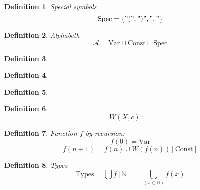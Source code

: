 \documentclass[10pt,a4paper]{article}
\newtheorem{mydef}{Definition}
\newcommand{\Var}{\mbox{Var}}
\newcommand{\Const}{\mbox{Const}}
\newcommand{\Spec}{\mbox{Spec}}
\newcommand{\Types}{\mbox{Types}}
\newcommand{\Nat}{\mathbb{N}}
\begin{document}
\begin{mydef} Special symbols 
\[ \Spec = \{"(",")",","\} \]
\end{mydef}

\begin{mydef}
Alphabeth \[ \mathcal{A} = \Var\sqcup\Const\sqcup\Spec \]
\end{mydef}
\begin{mydef}
\end{mydef}
\begin{mydef}
\end{mydef}
\begin{mydef}
\end{mydef}
\begin{mydef}
\[W(X,c):= \]
\end{mydef}
\begin{mydef}
Function $f$ by recursion:
\[f(0) = \Var\]
\[f(n+1) = f(n)\cup W(f(n))[\Const]\]
\end{mydef}
\begin{mydef}
Types
\[\Types = \bigcup f[\Nat] \ = \bigcup_{(x\in\Nat)}f(x) \]
\end{mydef}
\end{document}
